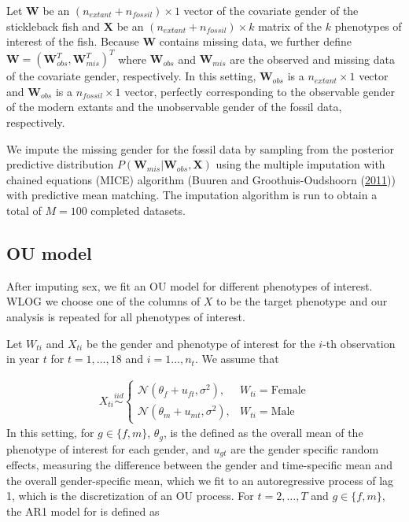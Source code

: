 \documentclass[
  12pt,
]{article}
\begin{document}
Let \(\boldsymbol{W}\) be an \((n_{extant} + n_{fossil}) \times 1\)
vector of the covariate gender of the stickleback fish and
\(\boldsymbol{X}\) be an \((n_{extant} + n_{fossil}) \times k\) matrix
of the \(k\) phenotypes of interest of the fish. Because
\(\boldsymbol{W}\) contains missing data, we further define
\(\boldsymbol{W} = (\boldsymbol{W}_{obs}^T,\boldsymbol{W}_{mis}^T)^T\)
where \(\boldsymbol{W}_{obs}\) and \(\boldsymbol{W}_{mis}\) are the
observed and missing data of the covariate gender, respectively. In this
setting, \(\boldsymbol{W}_{obs}\) is a \(n_{extant} \times 1\) vector
and \(\boldsymbol{W}_{obs}\) is a \(n_{fossil} \times 1\) vector,
perfectly corresponding to the observable gender of the modern extants
and the unobservable gender of the fossil data, respectively.

We impute the missing gender for the fossil data by sampling from the
posterior predictive distribution
\(P(\boldsymbol{W}_{mis}|\boldsymbol{W}_{obs}, \boldsymbol{X})\) using
the multiple imputation with chained equations (MICE) algorithm (Buuren
and Groothuis-Oudshoorn (\protect\hyperlink{ref-MICE}{2011})) with
predictive mean matching. The imputation algorithm is run to obtain a
total of \(M = 100\) completed datasets.

\hypertarget{ou-model}{%
\subsection{OU model}\label{ou-model}}

After imputing sex, we fit an OU model for different phenotypes of
interest. WLOG we choose one of the columns of \(X\) to be the target
phenotype and our analysis is repeated for all phenotypes of interest.

Let \(W_{ti}\) and \(X_{ti}\) be the gender and phenotype of interest
for the \(i\)-th observation in year \(t\) for \(t = 1, \ldots, 18\) and
\(i = 1\ldots,n_{t}\). We assume that

\[
\begin{aligned}
X_{ti} \overset{iid}{\sim}\left\{\begin{array}{ll} \mathcal{N}(\theta_f + u_{ft},\sigma^2), & W_{ti} = \text{Female} \\ \mathcal{N}(\theta_m + u_{mt},\sigma^2), & W_{ti} = \text{Male} \end{array}\right.
\end{aligned}
\] In this setting, for \(g \in \{f,m\}\), \(\theta_g\), is the defined
as the overall mean of the phenotype of interest for each gender, and
\(u_{gt}\) are the gender specific random effects, measuring the
difference between the gender and time-specific mean and the overall
gender-specific mean, which we fit to an autoregressive process of lag
1, which is the discretization of an OU process. For \(t = 2,\ldots,T\)
and \(g \in \{f,m\}\), the AR1 model for is defined as
\end{document}
